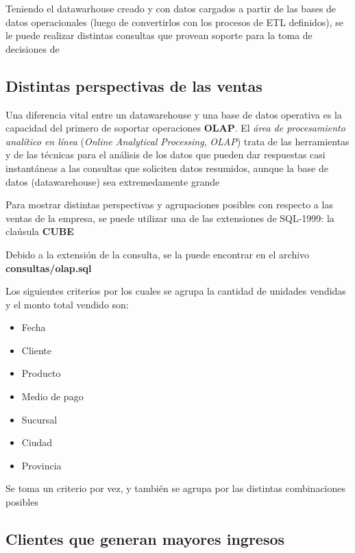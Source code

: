 Teniendo el datawarhouse creado y con datos cargados a partir de las bases de datos operacionales (luego de convertirlos con los procesos de ETL definidos), se le puede realizar distintas consultas que provean soporte para la toma de decisiones de 

\subsection{Distintas perspectivas de las ventas}

Una diferencia vital entre un datawarehouse y una base de datos operativa es la capacidad del primero de soportar operaciones \textbf{OLAP}. El \emph{área de procesamiento analítico en línea} (\emph{Online Analytical Processing}, \emph{OLAP}) trata de las herramientas y de las técnicas para el análisis de los datos que pueden dar respuestas casi instantáneas a las consultas que soliciten datos resumidos, aunque la base de datos (datawarehouse) sea extremedamente grande \autocite{silberschatz-olap}

Para mostrar distintas perspectivas y agrupaciones posibles con respecto a las ventas de la empresa, se puede utilizar una de las extensiones de SQL-1999: la claúsula \textbf{CUBE} 

Debido a la extensión de la consulta, se la puede encontrar en el archivo \textbf{consultas/olap.sql} 

Los siguientes criterios por los cuales se agrupa la cantidad de unidades vendidas y el monto total vendido son:

\begin{itemize}
    \item Fecha
    \item Cliente
    \item Producto
    \item Medio de pago
    \item Sucursal
    \item Ciudad
    \item Provincia
\end{itemize}

Se toma un criterio por vez, y también se agrupa por las distintas combinaciones posibles



\subsection{Clientes que generan mayores ingresos}


